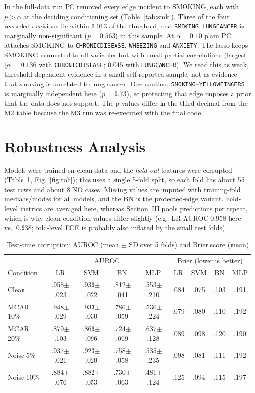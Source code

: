 \documentclass[10pt,twocolumn,letterpaper]{article}
\renewcommand{\_}{\textunderscore\hspace{0pt}}
\newcommand{\V}[1]{{\texttt{\footnotesize #1}}}
\begin{document}
In the full-data run PC removed every edge incident to SMOKING, each with $p>\alpha$ at the deciding conditioning set (Table~\ref{tab:smk}). Three of the four recorded decisions lie within 0.013 of the threshold, and \V{SMOKING}--\V{LUNG\_CANCER} is marginally non-significant ($p=0.563$) in this sample. At $\alpha=0.10$ plain PC attaches SMOKING to \V{CHRONIC\_DISEASE}, \V{WHEEZING} and \V{ANXIETY}. The lasso keeps SMOKING connected to all variables but with small partial correlations (largest $|\rho|=0.136$ with \V{CHRONIC\_DISEASE}; $0.045$ with \V{LUNG\_CANCER}). We read this as weak, threshold-dependent evidence in a small self-reported sample, not as evidence that smoking is unrelated to lung cancer. One caution: \V{SMOKING}--\V{YELLOW\_FINGERS} is marginally independent here ($p=0.73$), so protecting that edge imposes a prior that the data does not support. The p-values differ in the third decimal from the M2 table because the M3 run was re-executed with the final code.

\section{Robustness Analysis}
Models were trained on clean data and the \emph{held-out} features were corrupted (Table~\ref{tab:rob}, Fig.~\ref{fig:rob}); this uses a single 5-fold split, so each fold has about 55 test rows and about 8 NO cases. Missing values are imputed with training-fold medians/modes for all models, and the BN is the protected-edge variant. Fold-level metrics are averaged here, whereas Section~III pools predictions per repeat, which is why clean-condition values differ slightly (e.g.\ LR AUROC 0.958 here vs.\ 0.938; fold-level ECE is probably also inflated by the small test folds).

\begin{table}[t]
\centering
\caption{Test-time corruption: AUROC (mean $\pm$ SD over 5 folds) and Brier score (mean)}
\label{tab:rob}
\scriptsize
\begin{tabular}{@{}lcccc|cccc@{}}
\toprule
& \multicolumn{4}{c|}{AUROC} & \multicolumn{4}{c}{Brier (lower is better)}\\
Condition & LR & SVM & BN & MLP & LR & SVM & BN & MLP\\
\midrule
Clean & .958$\pm$.023 & .939$\pm$.022 & .812$\pm$.041 & .553$\pm$.210 & .084 & .075 & .103 & .191\\
MCAR 10\% & .948$\pm$.029 & .933$\pm$.030 & .786$\pm$.059 & .536$\pm$.224 & .079 & .080 & .110 & .192\\
MCAR 20\% & .879$\pm$.103 & .869$\pm$.096 & .724$\pm$.069 & .637$\pm$.128 & .089 & .098 & .120 & .190\\
Noise 5\% & .937$\pm$.021 & .923$\pm$.020 & .758$\pm$.058 & .535$\pm$.235 & .098 & .081 & .111 & .192\\
Noise 10\% & .884$\pm$.076 & .882$\pm$.053 & .730$\pm$.063 & .481$\pm$.124 & .125 & .094 & .115 & .197\\
\bottomrule
\end{tabular}
\end{table}
\end{document}
